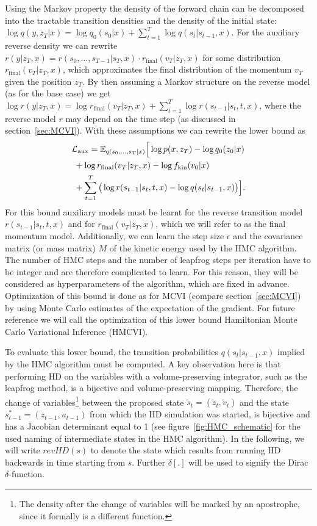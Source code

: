 Using the Markov property the density of the forward chain can be decomposed into the tractable transition densities and the density of the initial state: $\log q(y, z_T|x) = \log q_0(s_0|x) + \sum_{t=1}^T \log q(s_t|s_{t-1}, x)$. For the auxiliary reverse density we can rewrite $r(y | z_T, x) = r(s_0, \ldots, s_{T-1}| s_T, x) \cdot r_{\textrm{final}}(v_T | z_T, x)$ for some distribution $r_{\textrm{final}}(v_T|z_T, x)$, which approximates the final distribution of the momentum $v_T$ given the position $z_T$. By then assuming a Markov structure on the reverse model (as for the base case) we get $\log r(y | z_T, x) = \log r_{\textrm{final}}(v_T | z_T, x) + \sum_{t=1}^T \log r(s_{t-1}|s_t, t, x)$, where the reverse model $r$ may depend on the time step (as discussed in section~\ref{sec:MCVI}). With these assumptions we can rewrite the lower bound as
\begin{equation} \label{eq:HMCVIAuxLowerBound}
\begin{split}
&\mathcal{L_\textrm{aux}} = \mathbb{E}_{q(s_0, \ldots, s_T|x)} \Big[ \log p(x, z_T) - \log q_0(z_0|x) \\
&\;+ \log r_{\textrm{final}}(v_T | z_T, x) - \log f_\textrm{kin}(v_0|x)  \\ 
&\;+ \sum \limits_{t=1}^T \big( \log r(s_{t-1}|s_t, t, x) - \log q(s_t|s_{t-1}, x) \big) \Big].
\end{split}
\end{equation}
For this bound auxiliary models must be learnt for the reverse transition model $r(s_{t-1}|s_t, t, x)$ and for $r_{\textrm{final}}(v_T | z_T, x)$, which we will refer to as the final momentum model. Additionally, we can learn the step size $\epsilon$ and the covariance matrix (or mass matrix) $M$ of the kinetic energy used by the HMC algorithm. The number of HMC steps and the number of leapfrog steps per iteration have to be integer and are therefore complicated to learn. For this reason, they will be considered as hyperparameters of the algorithm, which are fixed in advance. Optimization of this bound is done as for MCVI (compare section~\ref{sec:MCVI}) by using Monte Carlo estimates of the expectation of the gradient. For future reference we will call the optimization of this lower bound Hamiltonian Monte Carlo Variational Inference (HMCVI).

To evaluate this lower bound, the transition probabilities $q(s_t|s_{t-1}, x)$ implied by the HMC algorithm must be computed. A key observation here is that performing HD on the variables with a volume-preserving integrator, such as the leapfrog method, is a bijective and volume-preserving mapping. Therefore, the change of variables\footnote{The density after the change of variables will be marked by an apostrophe, since it formally is a different function.} between the proposed state $\tilde{s}_t = (\tilde{z}_t, \tilde{v}_t)$ and the state $s^*_{t-1} = (z_{t-1}, u_{t-1})$ from which the HD simulation was started, is bijective and has a Jacobian determinant equal to 1 (see figure~\ref{fig:HMC_schematic} for the used naming of intermediate states in the HMC algorithm). In the following, we will write $revHD(s)$ to denote the state which results from running HD backwards in time starting from $s$. Further $\delta[.]$ will be used to signify the Dirac $\delta$-function.

